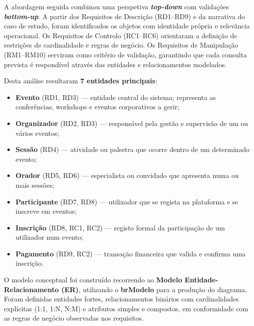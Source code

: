 \documentclass[runningheads]{llncs}
\begin{document}
                \vspace{0.2cm}

                A abordagem seguida combinou uma perspetiva \textbf{\textit{top-down}} com validações
                \textbf{\textit{bottom-up}}. A partir dos Requisitos de Descrição (RD1--RD9) e da narrativa do
                caso de estudo, foram identificados os objetos com identidade própria e relevância
                operacional. Os Requisitos de Controlo (RC1--RC6) orientaram a definição de restrições de
                cardinalidade e regras de negócio. Os Requisitos de Manipulação (RM1--RM10) serviram como
                critério de validação, garantindo que cada consulta prevista é respondível através das
                entidades e relacionamentos modelados.

                \vspace{0.2cm}

                Desta análise resultaram \textbf{7 entidades principais}:
                \begin{itemize}
                    \item \textbf{Evento} (RD1, RD3) --- entidade central do sistema; representa as conferências, workshops e eventos corporativos a gerir;
                    \item \textbf{Organizador} (RD2, RD3) --- responsável pela gestão e supervisão de um ou vários eventos;
                    \item \textbf{Sessão} (RD4) --- atividade ou palestra que ocorre dentro de um determinado evento;
                    \item \textbf{Orador} (RD5, RD6) --- especialista ou convidado que apresenta numa ou mais sessões;
                    \item \textbf{Participante} (RD7, RD8) --- utilizador que se regista na plataforma e se inscreve em eventos;
                    \item \textbf{Inscrição} (RD8, RC1, RC2) --- registo formal da participação de um utilizador num evento;
                    \item \textbf{Pagamento} (RD9, RC2) --- transação financeira que valida e confirma uma inscrição.
                \end{itemize}

                \vspace{0.2cm}

                O modelo conceptual foi construído recorrendo ao \textbf{Modelo Entidade-Relacionamento
                (ER)}, utilizando o \textbf{brModelo} para a produção do diagrama. Foram definidas entidades
                fortes, relacionamentos binários com cardinalidades explícitas (1:1, 1:N, N:M) e atributos
                simples e compostos, em conformidade com as regras de negócio observadas nos requisitos.
\end{document}
